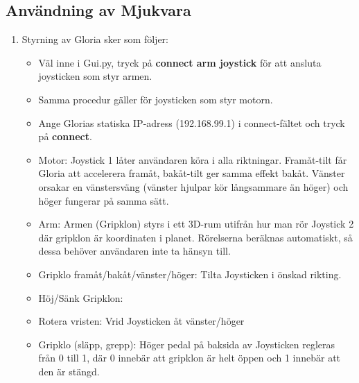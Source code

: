 \subsection{Användning av Mjukvara}
\begin{enumerate}
	\item Styrning av Gloria sker som följer: 
	\begin{itemize}
		\item Väl inne i Gui.py, tryck på \textbf{connect arm joystick} för att ansluta joysticken som styr armen.
		\item Samma procedur gäller för joysticken som styr motorn.
		\item Ange Glorias statiska IP-adress (192.168.99.1) i connect-fältet och tryck på \textbf{connect}.
		\item Motor: Joystick 1 låter användaren köra i alla riktningar. Framåt-tilt får Gloria att accelerera framåt, bakåt-tilt ger samma effekt bakåt. Vänster orsakar en vänstersväng (vänster hjulpar kör långsammare än höger) och höger fungerar på samma sätt.
		\item Arm: Armen (Gripklon) styrs i ett 3D-rum utifrån hur man rör Joystick 2 där gripklon är koordinaten i planet. Rörelserna beräknas automatiskt, så dessa behöver användaren inte ta hänsyn till. 
		\item Gripklo framåt/bakåt/vänster/höger: Tilta Joysticken i önskad rikting.
		\item Höj/Sänk Gripklon: %
		\item Rotera vristen: Vrid Joysticken åt vänster/höger
		\item Gripklo (släpp, grepp): Höger pedal på baksida av Joysticken regleras från 0 till 1, där 0 innebär att gripklon är helt öppen och 1 innebär att den är stängd.
		

\end{itemize}
\end{enumerate}
